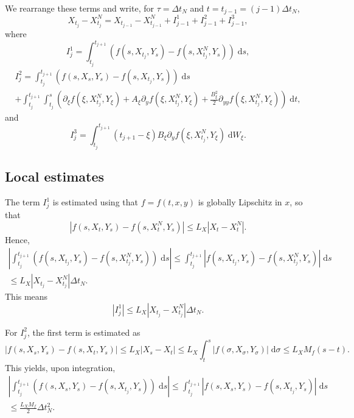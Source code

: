 \documentclass[reqno,12pt]{amsart}
\theoremstyle{plain}%
\theoremstyle{definition}
\begin{document}
We rearrange these terms and write, for $\tau = \Delta t_N$ and $t = t_{j-1} = (j-1)\Delta t_N$,
\begin{equation}
    \label{stepexpression}
    X_{t_j} - X_{t_j}^N  = X_{t_{j-1}} - X_{t_{j-1}}^N  + I_{j-1}^{1} + I_{j-1}^{2} + I_{j-1}^{3},
\end{equation}
where
$$
I_j^{1} = \int_{t_j}^{t_{j+1}} \left( f(s, X_{t_j}, Y_s) - f(s, X_{t_j}^N, Y_s) \right)\;\mathrm{d}s,
$$
\begin{multline*}
  I_j^2 =  \int_{t_j}^{t_{j+1}}  \left( f(s, X_s, Y_s) - f(s, X_{t_j}, Y_s) \right)\;\mathrm{d}s \\ 
 +  \int_{t_j}^{t_{j+1}} \int_{t_j}^s \left(\partial_\xi f(\xi, X_{t_j}^N, Y_\xi) + A_\xi \partial_y f(\xi, X_{t_j}^N, Y_\xi)  + \frac{B_\xi^2}{2}\partial_{yy}f(\xi, X_{t_j}^N, Y_\xi) \right) \;\mathrm{d}t,
\end{multline*}
and
$$
I_j^3 = \int_{t_j}^{t_{j+1}}  (t_{j+1} - \xi) B_\xi \partial_y f(\xi, X_{t_j}^N, Y_\xi) \;\mathrm{d}W_\xi.
$$

\subsection{Local estimates}

The term $I_j^1$ is estimated using that $f=f(t, x, y)$ is globally Lipschitz in $x$, so that
$$
\left| f(s, X_t, Y_s) - f(s, X_t^N, Y_s) \right| \leq L_X |X_t - X_t^N|.
$$
Hence,
\begin{multline*}
\left|  \int_{t_j}^{t_{j+1}} \left( f(s, X_{t_j}, Y_s) - f(s, X_{t_j}^N, Y_s)  \right) \;\mathrm{d}s \right| \leq   \int_{t_j}^{t_{j+1}} \left| f(s, X_{t_j}, Y_s) - f(s, X_{t_j}^N, Y_s)  \right| \;\mathrm{d} s \\ \leq L_X |X_{t_j} - X_{t_j}^N| \Delta t_N.
\end{multline*}
This means
\begin{equation}
\label{I1estimate}
\left| I_j^1 \right| \leq L_X |X_{t_j} - X_{t_j}^N| \Delta t_N.
\end{equation}

For $I_j^2$, the first term is estimated as
$$
\left| f(s, X_s, Y_s) - f(s, X_t, Y_s) \right| \leq L_X |X_s - X_t| \leq L_X \int_t^s |f(\sigma, X_\sigma, Y_\sigma)| \;\mathrm{d}\sigma \leq L_X M_f (s - t).
$$
This yields, upon integration,
\begin{multline*}
\left|  \int_{t_j}^{t_{j+1}} \left(f(s, X_s, Y_s) - f(s, X_{t_j}, Y_s) \right) \;\mathrm{d}s \right| \leq  \int_{t_j}^{t_{j+1}} \left| f(s, X_s, Y_s) - f(s, X_{t_j}, Y_s) \right| \;\mathrm{d} s \\
\leq \frac{L_X M_f}{2} \Delta t_N^2.
\end{multline*}
\end{document}
